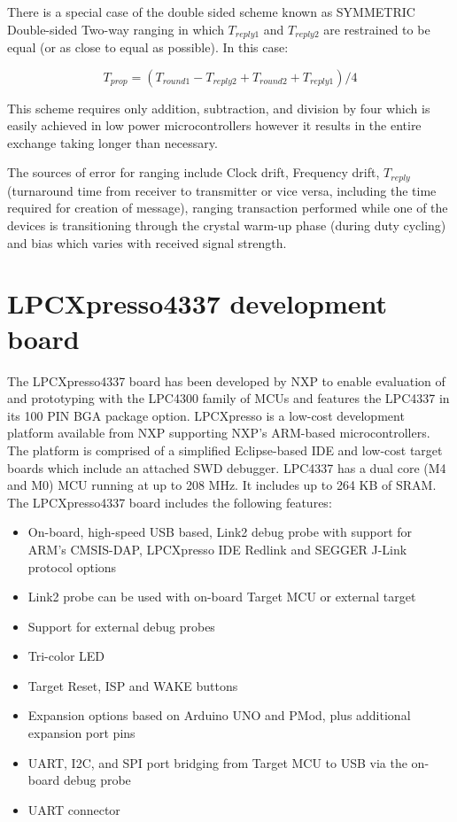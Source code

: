 There is a special case of the double sided scheme known as SYMMETRIC Double-sided Two-way ranging in which $T_{reply1}$ and $T_{reply2}$ are restrained to be equal (or as close to equal as possible).  In this case: 

\begin{equation}
T_{prop}=(T_{round1} - T_{reply2} + T_{round2} + T_{reply1})/4
\end{equation}

This scheme requires only addition, subtraction, and division by four which is easily achieved in low power microcontrollers however it results in the entire exchange taking longer than necessary. 

The sources of error for ranging include Clock drift, Frequency drift, $T_{reply}$ (turnaround time from receiver to transmitter or vice versa, including the time required for creation of message), ranging transaction performed while one of the devices is transitioning through the crystal warm-up phase (during duty cycling) and bias which varies with received signal strength.

\section{LPCXpresso4337 development board}
The LPCXpresso4337 board {\cite{LPCUserManual}} has been developed by NXP to enable evaluation of and prototyping with the LPC4300 family of MCUs and features the LPC4337 in its 100 PIN BGA package option. LPCXpresso is a low-cost development platform available from NXP supporting NXP's ARM-based microcontrollers. The platform is comprised of a simplified Eclipse-based IDE and low-cost target boards which include an attached SWD debugger. LPC4337 has a dual core (M4 and M0) MCU running at up to 208 MHz. It includes up to 264 KB of SRAM. 
The LPCXpresso4337 board includes the following features: 
\begin{itemize}
    \item On-board, high-speed USB based, Link2 debug probe with support for ARM’s CMSIS-DAP, LPCXpresso IDE Redlink and SEGGER J-Link protocol options 
    \item Link2 probe can be used with on-board Target MCU or external target 
    \item Support for external debug probes 
    \item Tri-color LED 
    \item Target Reset, ISP and WAKE buttons 
    \item Expansion options based on Arduino UNO and PMod, plus additional expansion port pins 
    \item UART, I2C, and SPI port bridging from Target MCU to USB via the on-board debug probe 
    \item UART connector 
\end{itemize}

